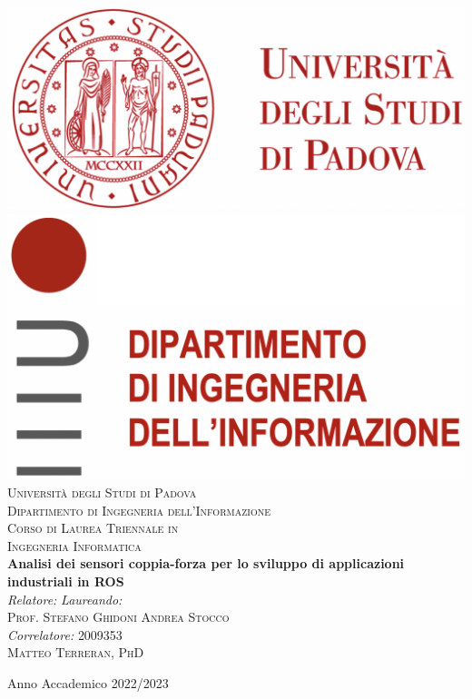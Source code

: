 


\begin{titlepage}
\begin{center}

\includegraphics[scale=0.2]{images/logo_unipd.png} \hfill \includegraphics[scale=0.2]{images/logo_dei.png}\\
\vspace{0.8cm}
\textsc{\LARGE Universit\`{a} degli Studi di Padova}\\
\vspace{0.45cm}
\textsc{\large Dipartimento di Ingegneria dell'Informazione}\\
\vspace{0.4cm}
\textsc{\large Corso di Laurea Triennale in}\\
\textsc{\large Ingegneria Informatica}\\
\vfill
{ \LARGE \bfseries Analisi dei sensori coppia-forza per lo sviluppo di applicazioni industriali in ROS
}\\
\vfill
\textit{\large Relatore:} \hfill \textit{\large Laureando:}\\
\textsc{\large Prof. Stefano Ghidoni} \hfill \textsc{Andrea Stocco}\\
\textit{\large Correlatore:} \hfill \textsc{2009353}\\
\textsc{\large Matteo Terreran, PhD} \hfill \textit{}

\vfill
{\large Anno Accademico 2022/2023}
\end{center}
\end{titlepage}

